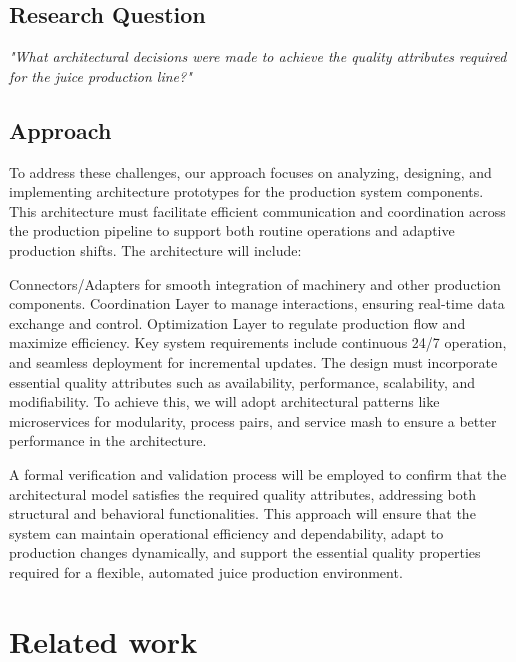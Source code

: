 \documentclass[conference]{IEEEtran}
\begin{document}
\subsection{Research Question}
\label{sec:question}
\begin{center}
\textit{"What architectural decisions were made to achieve the quality attributes required for the juice production line?"}
\end{center}

\subsection{Approach}
To address these challenges, our approach focuses on analyzing, designing, and implementing architecture prototypes for the production system components. This architecture must facilitate efficient communication and coordination across the production pipeline to support both routine operations and adaptive production shifts. The architecture will include:

Connectors/Adapters for smooth integration of machinery and other production components.
Coordination Layer to manage interactions, ensuring real-time data exchange and control.
Optimization Layer to regulate production flow and maximize efficiency.
Key system requirements include continuous 24/7 operation, and seamless deployment for incremental updates. The design must incorporate essential quality attributes such as availability, performance, scalability, and modifiability. To achieve this, we will adopt architectural patterns like microservices for modularity, process pairs, and service mash to ensure a better performance in the architecture.

A formal verification and validation process will be employed to confirm that the architectural model satisfies the required quality attributes, addressing both structural and behavioral functionalities. This approach will ensure that the system can maintain operational efficiency and dependability, adapt to production changes dynamically, and support the essential quality properties required for a flexible, automated juice production environment.

\section{Related work}
\end{document}
